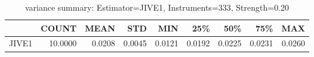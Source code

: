 \begin{table}[ht]
\centering
\caption{variance summary: Estimator=JIVE1, Instruments=333, Strength=0.20}
\begin{tabular}{lrrrrrrrr}
\toprule
 & COUNT & MEAN & STD & MIN & 25\% & 50\% & 75\% & MAX \\
\midrule
JIVE1 & 10.0000 & 0.0208 & 0.0045 & 0.0121 & 0.0192 & 0.0225 & 0.0231 & 0.0260 \\
\bottomrule
\end{tabular}
\end{table}
